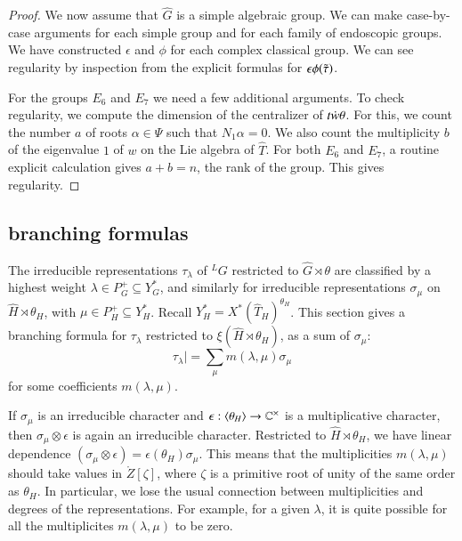 \begin{proof}
We now assume that $\hat G$ is a simple algebraic group.
We can make case-by-case arguments for each simple group and for each
family of endoscopic groups.  We have constructed $\epsilon$ and $\phi$ for each complex classical group.
We can see regularity by inspection from the explicit formulas for $\epsilon\phi(\tilde\tau)$.

For the groups $E_6$ and $E_7$ we need a few additional arguments.
To check regularity, we compute the dimension of the centralizer of $t\dot w \theta$.  For this, we count the number $a$ of
roots $\alpha\in\Psi$ such that $N_1\alpha=0$.  We also count the multiplicity $b$ of the eigenvalue $1$ of $w$ on the Lie
algebra of $\hat T$.  For both $E_6$ and $E_7$, a routine explicit calculation gives $a+b = n$, the rank of the group.
This gives regularity.



\end{proof}



\subsection{branching formulas}\label{sec:branch}

The irreducible representations $\tau_\lambda$ of ${}^LG$ restricted to $\hat G\rtimes\theta$ are classified
by a highest weight $\lambda\in P^+_G\subseteq Y^*_G$, and similarly for irreducible representations $\sigma_\mu$
on $\hat H\rtimes \theta_H$, with $\mu\in P^+_H\subseteq Y^*_H$.  Recall $Y^*_H = X^*(\hat T_H)^{\theta_H}$.
This section gives a  branching formula for $\tau_\lambda$ restricted to $\xi(\hat H\rtimes\theta_H)$,
as a sum of $\sigma_\mu$:
\[
\tau_\lambda| = \sum_\mu m(\lambda,\mu) \sigma_\mu
\]
for some coefficients $m(\lambda,\mu)$.  

If $\sigma_\mu$ is an irreducible character and $\epsilon:\langle{\theta_H}\rangle\to \mathbb{C}^\times$ is a multiplicative character,
then $\sigma_\mu\otimes \epsilon$ is again an irreducible character.  Restricted to $\hat H\rtimes\theta_H$, we have
 linear dependence $(\sigma_\mu\otimes\epsilon) = \epsilon(\theta_H) \sigma_\mu $.
This means that the multiplicities $m(\lambda,\mu)$ should take values in $\ring{Z}[\zeta]$, where $\zeta$ is a primitive
root of unity of the same order as $\theta_H$.  In particular, 
we lose the usual connection between multiplicities and degrees of the representations. For example,
for a given $\lambda$,
it is quite possible for all the multiplicites $m(\lambda,\mu)$ to be zero.




